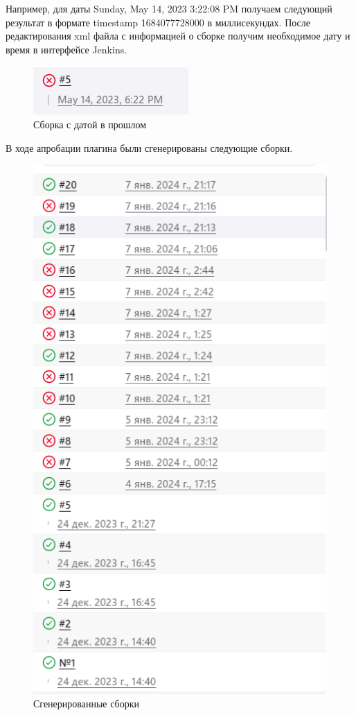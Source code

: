 Например, для даты Sunday, May 14, 2023 3:22:08 PM получаем следующий результат в формате timestamp 1684077728000 в миллисекундах. После редактирования xml файла с информацией о сборке получим необходимое дату  и время в интерфейсе Jenkins.

 \begin{figure}[ht!] 
	\center
	\includegraphics [scale=0.87] {my_folder/images//lastBuild}
	\caption{Сборка с датой в прошлом} 
	\label{fig:lastBuild}  
\end{figure}
 
 В ходе апробации плагина были сгенерированы следующие сборки.
 
 \begin{figure}[ht!] 
	\center
	\includegraphics [scale=0.47] {my_folder/images//builds}
	\caption{Сгенерированные сборки} 
	\label{fig:builds}  
\end{figure}

